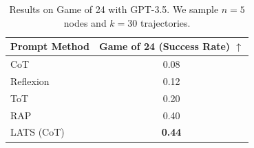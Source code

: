 \begin{table}[t]
  \centering
  \begin{tabular}{l|c}
  \toprule
    Prompt Method & Game of 24 (Success Rate) $\uparrow$ \\
    \midrule
    CoT {\scriptsize~\citep{wei2022chain}} & 0.08 \\
    Reflexion {\scriptsize~\citep{shinn2023reflexion}} & 0.12 \\ 
    ToT {\scriptsize~\citep{yao2023tree}} & 0.20 \\
    RAP {\scriptsize~\citep{hao2023reasoning}}& 0.40 \\
    LATS (CoT) & \textbf{0.44}  \\
    \bottomrule
    \end{tabular}
    \caption{Results on Game of 24 with GPT-3.5. We sample $n=5$ nodes and $k=30$ trajectories. %
    }
    \label{table:game24}
\end{table}
